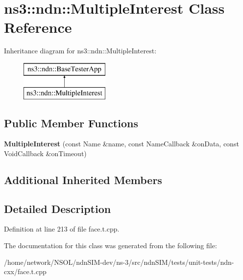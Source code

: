 \hypertarget{classns3_1_1ndn_1_1MultipleInterest}{}\section{ns3\+:\+:ndn\+:\+:Multiple\+Interest Class Reference}
\label{classns3_1_1ndn_1_1MultipleInterest}
Inheritance diagram for ns3\+:\+:ndn\+:\+:Multiple\+Interest\+:\begin{figure}[H]
\begin{center}
\leavevmode
\includegraphics[height=2.000000cm]{classns3_1_1ndn_1_1MultipleInterest}
\end{center}
\end{figure}
\subsection*{Public Member Functions}
\begin{DoxyCompactItemize}
\item 
{\bfseries Multiple\+Interest} (const Name \&name, const Name\+Callback \&on\+Data, const Void\+Callback \&on\+Timeout)\hypertarget{classns3_1_1ndn_1_1MultipleInterest_ad7890f0d784f827d135623305b882592}{}\label{classns3_1_1ndn_1_1MultipleInterest_ad7890f0d784f827d135623305b882592}

\end{DoxyCompactItemize}
\subsection*{Additional Inherited Members}


\subsection{Detailed Description}


Definition at line 213 of file face.\+t.\+cpp.



The documentation for this class was generated from the following file\+:\begin{DoxyCompactItemize}
\item 
/home/network/\+N\+S\+O\+L/ndn\+S\+I\+M-\/dev/ns-\/3/src/ndn\+S\+I\+M/tests/unit-\/tests/ndn-\/cxx/face.\+t.\+cpp\end{DoxyCompactItemize}
